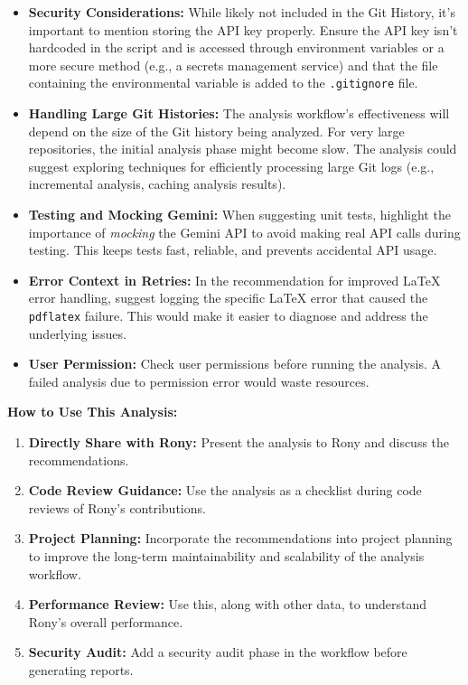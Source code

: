 \documentclass{article}
\begin{document}
\begin{itemize}
\begin{itemize}
\begin{itemize}
\begin{itemize}
    \item \textbf{Security Considerations:} While likely not included in the Git History, it's important to mention storing the API key properly. Ensure the API key isn't hardcoded in the script and is accessed through environment variables or a more secure method (e.g., a secrets management service) and that the file containing the environmental variable is added to the \texttt{.gitignore} file.
    \item \textbf{Handling Large Git Histories:} The analysis workflow's effectiveness will depend on the size of the Git history being analyzed. For very large repositories, the initial analysis phase might become slow. The analysis could suggest exploring techniques for efficiently processing large Git logs (e.g., incremental analysis, caching analysis results).
    \item \textbf{Testing and Mocking Gemini:} When suggesting unit tests, highlight the importance of \textit{mocking} the Gemini API to avoid making real API calls during testing. This keeps tests fast, reliable, and prevents accidental API usage.
    \item \textbf{Error Context in Retries:} In the recommendation for improved LaTeX error handling, suggest logging the specific LaTeX error that caused the \texttt{pdflatex} failure. This would make it easier to diagnose and address the underlying issues.
    \item \textbf{User Permission:} Check user permissions before running the analysis. A failed analysis due to permission error would waste resources.
\end{itemize}
\textbf{How to Use This Analysis:}
\begin{enumerate}
    \item \textbf{Directly Share with Rony:}  Present the analysis to Rony and discuss the recommendations.
    \item \textbf{Code Review Guidance:} Use the analysis as a checklist during code reviews of Rony's contributions.
    \item \textbf{Project Planning:}  Incorporate the recommendations into project planning to improve the long-term maintainability and scalability of the analysis workflow.
    \item \textbf{Performance Review:}  Use this, along with other data, to understand Rony's overall performance.
    \item \textbf{Security Audit:} Add a security audit phase in the workflow before generating reports.
\end{enumerate}

\end{itemize}
\end{itemize}
\end{itemize}
\end{document}
